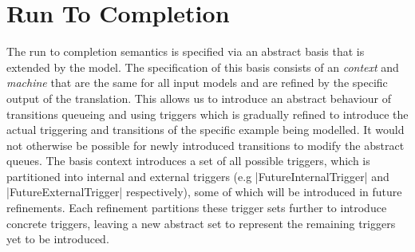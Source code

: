 

\section{Run To Completion}
\label{sec:run-completion}
\label{sec:translation}
The run to completion semantics is specified via an abstract basis that is extended by the model.
%
%
%
The specification of this basis consists of an \EVENTB \emph{context} and \emph{machine} that are
the same for all input models and are refined by the specific output of the translation.
This allows us to introduce an abstract behaviour of transitions queueing and using triggers which is gradually refined to introduce the actual triggering and transitions of the specific example being modelled.
It would not otherwise be possible for newly introduced transitions to modify the abstract queues.
The basis context introduces a set of all possible triggers, 
which is partitioned into internal and external triggers
(e.g |FutureInternalTrigger| and |FutureExternalTrigger| respectively),
some of which will be introduced in future refinements.
Each refinement partitions these trigger sets further to introduce concrete triggers,
leaving a new abstract set to represent the remaining triggers yet to be introduced.



